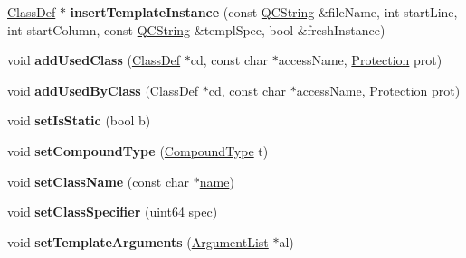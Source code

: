 \begin{DoxyCompactItemize}
\item 
\hypertarget{class_class_def_a34a34cc736e598b3f87a31b8b7004e67}{\hyperlink{class_class_def}{Class\-Def} $\ast$ {\bfseries insert\-Template\-Instance} (const \hyperlink{class_q_c_string}{Q\-C\-String} \&file\-Name, int start\-Line, int start\-Column, const \hyperlink{class_q_c_string}{Q\-C\-String} \&templ\-Spec, bool \&fresh\-Instance)}\label{class_class_def_a34a34cc736e598b3f87a31b8b7004e67}

\item 
\hypertarget{class_class_def_a16de2612d86db3891ff4473360df91f2}{void {\bfseries add\-Used\-Class} (\hyperlink{class_class_def}{Class\-Def} $\ast$cd, const char $\ast$access\-Name, \hyperlink{types_8h_a90e352184df58cd09455fe9996cd4ded}{Protection} prot)}\label{class_class_def_a16de2612d86db3891ff4473360df91f2}

\item 
\hypertarget{class_class_def_acc3c6f6e4c11eab7d9e06eeb4315b5de}{void {\bfseries add\-Used\-By\-Class} (\hyperlink{class_class_def}{Class\-Def} $\ast$cd, const char $\ast$access\-Name, \hyperlink{types_8h_a90e352184df58cd09455fe9996cd4ded}{Protection} prot)}\label{class_class_def_acc3c6f6e4c11eab7d9e06eeb4315b5de}

\item 
\hypertarget{class_class_def_ac2c6a33bc8e9784c364fe26efb3c5cdf}{void {\bfseries set\-Is\-Static} (bool b)}\label{class_class_def_ac2c6a33bc8e9784c364fe26efb3c5cdf}

\item 
\hypertarget{class_class_def_aefa06ec54ea76f68fed9ec22c9a2defd}{void {\bfseries set\-Compound\-Type} (\hyperlink{class_class_def_a768a6f0a6fd7e9087ff7971abbcc3f36}{Compound\-Type} t)}\label{class_class_def_aefa06ec54ea76f68fed9ec22c9a2defd}

\item 
\hypertarget{class_class_def_a90c959892d0ff402cb479f4f673126b4}{void {\bfseries set\-Class\-Name} (const char $\ast$\hyperlink{class_definition_a2c310e06c9aadc6fb218f80fcbb5c695}{name})}\label{class_class_def_a90c959892d0ff402cb479f4f673126b4}

\item 
\hypertarget{class_class_def_adbc5b8eac2c5ec37df70fcafa90f6281}{void {\bfseries set\-Class\-Specifier} (uint64 spec)}\label{class_class_def_adbc5b8eac2c5ec37df70fcafa90f6281}

\item 
\hypertarget{class_class_def_a2092cb0ab215a3f70f9024525aa21591}{void {\bfseries set\-Template\-Arguments} (\hyperlink{class_argument_list}{Argument\-List} $\ast$al)}\label{class_class_def_a2092cb0ab215a3f70f9024525aa21591}


\end{DoxyCompactItemize}
